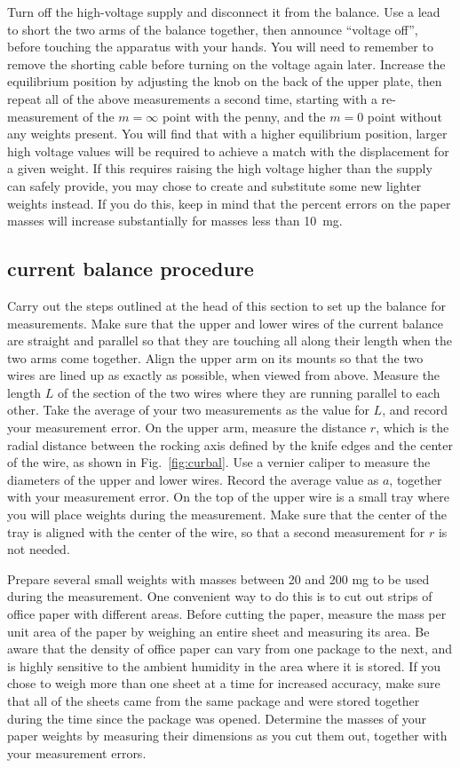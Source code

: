 \documentclass{revtex4}
\begin{document}
Turn off the high-voltage supply and disconnect it from the balance.
Use a lead to short the two arms of the balance together, then announce
``voltage off'', before touching the apparatus with your hands.  You
will need to remember to remove the shorting cable before turning on
the voltage again later.
Increase the equilibrium position by adjusting the knob on the back of
the upper plate, then repeat all of the above measurements a second time,
starting with a re-measurement of the $m=\infty$ point with the penny,
and the $m=0$ point without any weights present.  You will
find that with a higher equilibrium position, larger high voltage values
will be required to achieve a match with the displacement for a given
weight.  If this requires raising the high voltage higher than the supply
can safely provide, you may chose to create and substitute some new lighter
weights instead.  If you do this, keep in mind that the percent errors on
the paper masses will increase substantially for masses less than 10~mg.

\subsection{current balance procedure}

Carry out the steps outlined at the head of this section
to set up the balance for measurements.  Make
sure that the upper and lower wires of the current balance are straight
and parallel so that they are touching all along their length when the
two arms come together.  Align the upper arm on its mounts so that the
two wires are lined up as exactly as possible, when viewed from above.
Measure the length $L$ of the section of the two wires where they are
running parallel to each other.  Take the average of your two
measurements as the value for $L$, and record your measurement error.
On the upper arm, measure the distance $r$, which is the radial distance
between the rocking axis defined by the knife edges and the center of the
wire, as shown in Fig.~\ref{fig:curbal}.  Use a vernier caliper to measure
the diameters of the upper and lower wires.  Record the average value
as $a$, together with your measurement error.
On the top of the upper wire is a small tray where you will place weights
during the measurement.  Make sure that the center of the tray is aligned
with the center of the wire, so that a second measurement for $r$ is not
needed.

Prepare several small weights with masses between 20 and 200 mg to be used
during the measurement.  One convenient way to do this is to cut out strips
of office paper with different areas.  Before cutting the paper, measure the
mass per unit area of the paper by weighing an entire sheet and measuring its
area.  Be aware that the density of office paper can vary from one package to
the next, and is highly sensitive to the ambient humidity in the area where
it is stored.  If you chose to weigh more than one sheet at a time for
increased accuracy, make sure that all of the sheets came from the same
package and were stored together during the time since the package was
opened.  Determine the masses of your paper weights by measuring their
dimensions as you cut them out, together with your measurement errors.
\end{document}

